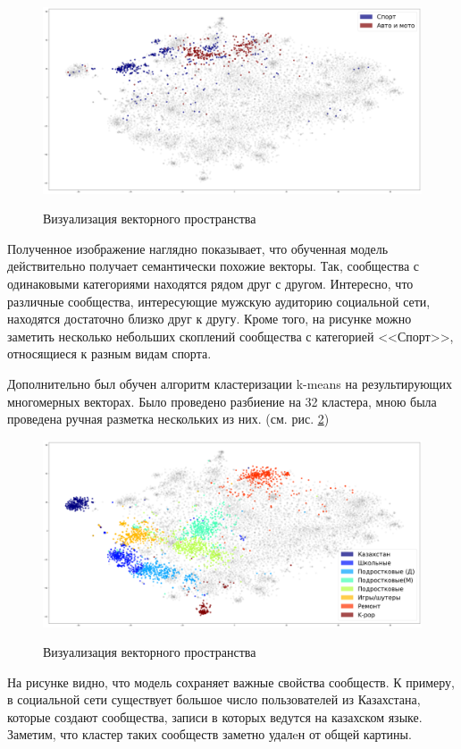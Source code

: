 \documentclass[times,specification,annotation]{itmo-student-thesis}
\begin{document}
\begin{figure}[h]
\caption{Визуализация векторного пространства}
\centering
\includegraphics[width=1\textwidth]{index0}
\label{pic:categories}
\end{figure}

Полученное изображение наглядно показывает, что обученная модель действительно получает семантически похожие векторы. Так, сообщества с одинаковыми категориями находятся рядом друг с другом. Интересно, что различные сообщества, интересующие мужскую аудиторию социальной сети, находятся достаточно близко друг к другу. Кроме того, на рисунке можно заметить несколько небольших скоплений сообщества с категорией <<Спорт>>, относящиеся к разным видам спорта.  

Дополнительно был обучен алгоритм кластеризации k-means на результирующих многомерных векторах. Было проведено разбиение на 32 кластера, мною была проведена ручная разметка нескольких из них. (см. рис. \ref{pic:clusters})

\begin{figure}[h]
\caption{Визуализация векторного пространства}
\centering
\includegraphics[width=1\textwidth]{clusters}
\label{pic:clusters}
\end{figure}

На рисунке видно, что модель сохраняет важные свойства сообществ. К примеру, в социальной сети существует большое число пользователей из Казахстана, которые создают сообщества, записи в которых ведутся на казахском языке. Заметим, что кластер таких сообществ заметно удалeн от общей картины. 
\end{document}
